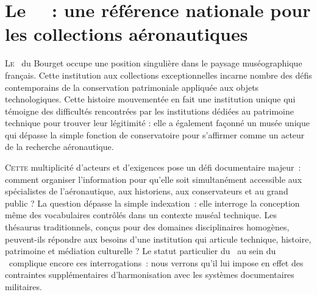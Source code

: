 \chapter[Une référence nationale]{\label{I-A}Le \mae~~: une référence nationale pour les collections aéronautiques}

\lettrine{L}e \maelong~du Bourget occupe une position singulière dans le paysage muséographique français. Cette institution aux collections exceptionnelles incarne nombre des défis contemporains de la conservation patrimoniale appliquée aux objets technologiques. Cette histoire mouvementée en fait une institution unique qui témoigne des difficultés rencontrées par les institutions dédiées au patrimoine technique pour trouver leur légitimité : elle a également façonné un musée unique qui dépasse la simple fonction de conservatoire pour s'affirmer comme un acteur de la recherche aéronautique.






\bigskip
\bigskip
\bigskip

\lettrine{C}{ette} multiplicité d'acteurs et d'exigences pose un défi documentaire majeur~: comment organiser l'information pour qu'elle soit simultanément accessible aux spécialistes de l'aéronautique, aux historiens, aux conservateurs et au grand public ? La question dépasse la simple indexation~: elle interroge la conception même des vocabulaires contrôlés dans un contexte muséal technique. Les thésaurus traditionnels, conçus pour des domaines disciplinaires homogènes, peuvent-ils répondre aux besoins d'une institution qui articule technique, histoire, patrimoine et médiation culturelle ?
Le statut particulier du \mae~au sein du \minarm~complique encore ces interrogations~: nous verrons qu'il lui impose en effet des contraintes supplémentaires d'harmonisation avec les systèmes documentaires militaires.